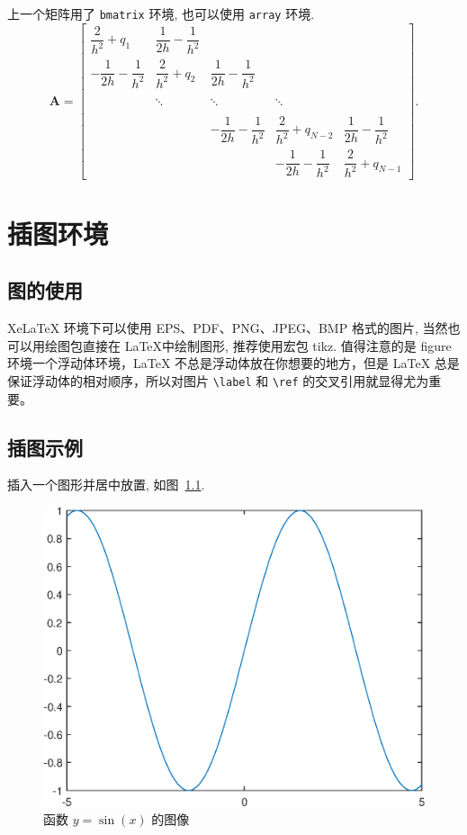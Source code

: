 \documentclass[UTF8,openany,twoside,12pt]{book}
\theoremstyle{plain}
\begin{document}
上一个矩阵用了 \verb|bmatrix| 环境, 也可以使用 \verb|array| 环境.
\begin{equation}\label{equ:matrix2}
\boldsymbol{A}=\left[\begin{array}{cccccc}
\dfrac{2}{h^{2}}+q_{1} & \dfrac{1}{2h}-\dfrac{1}{h^{2}} &   &  &  \\[8pt]
 -\dfrac{1}{2h}-\dfrac{1}{h^{2}} & \dfrac{2}{h^{2}}+q_{2} & \dfrac{1}{2h}-\dfrac{1}{h^{2}}  & &  \\[8pt]
  &  &  &  &    \\
   &  \ddots  & \ddots  &  \ddots  &  \\[8pt]
   &  &  &  &    \\
  &   & -\dfrac{1}{2h}-\dfrac{1}{h^{2}} & \dfrac{2}{h^{2}}+q_{N-2}& \dfrac{1}{2h}-\dfrac{1}{h^{2}} \\[8pt]
  &  &  & -\dfrac{1}{2h}-\dfrac{1}{h^{2}} & \dfrac{2}{h^{2}}+q_{N-1}
\end{array}\right].
\end{equation}




\chapter{插图环境}

\section{图的使用}

XeLaTeX 环境下可以使用 EPS、PDF、PNG、JPEG、BMP 格式的图片, 当然也可以用绘图包直接在 \LaTeX 中绘制图形, 推荐使用宏包 tikz. 值得注意的是 figure 环境一个浮动体环境，LaTeX 不总是浮动体放在你想要的地方，但是 LaTeX 总是保证浮动体的相对顺序，所以对图片 \verb|\label| 和 \verb|\ref| 的交叉引用就显得尤为重要。

\section{插图示例}

插入一个图形并居中放置, 如图~\ref{fig:sinx}.
\begin{figure}[htp!]
  \centering
  \includegraphics[width=0.48\linewidth]{image1.eps}
  \caption{函数 $y=\sin(x)$ 的图像}\label{fig:sinx}
\end{figure}
\end{document}

